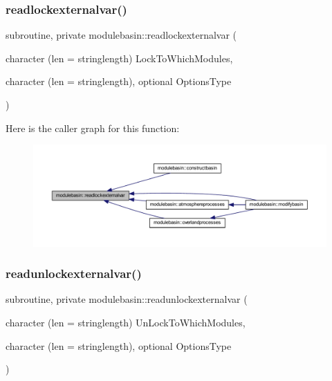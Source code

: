 \subsubsection{\texorpdfstring{readlockexternalvar()}{readlockexternalvar()}}
{\footnotesize\ttfamily subroutine, private modulebasin\+::readlockexternalvar (\begin{DoxyParamCaption}\item[{character (len = stringlength)}]{Lock\+To\+Which\+Modules,  }\item[{character (len = stringlength), optional}]{Options\+Type }\end{DoxyParamCaption})\hspace{0.3cm}{\ttfamily [private]}}

Here is the caller graph for this function\+:\nopagebreak
\begin{figure}[H]
\begin{center}
\leavevmode
\includegraphics[width=350pt]{namespacemodulebasin_adebce1a3581c733f01c10813a94c4dea_icgraph}
\end{center}
\end{figure}
\mbox{\label{namespacemodulebasin_aff09c4da760fd9cda4b797242d7ff522}} 
\subsubsection{\texorpdfstring{readunlockexternalvar()}{readunlockexternalvar()}}
{\footnotesize\ttfamily subroutine, private modulebasin\+::readunlockexternalvar (\begin{DoxyParamCaption}\item[{character (len = stringlength)}]{Un\+Lock\+To\+Which\+Modules,  }\item[{character (len = stringlength), optional}]{Options\+Type }\end{DoxyParamCaption})\hspace{0.3cm}{\ttfamily [private]}}

